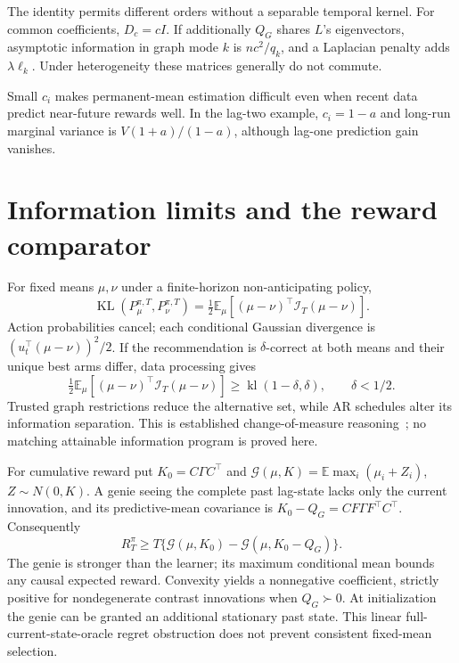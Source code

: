 \documentclass[11pt]{article}
\newcommand{\E}{\mathbb E}
\newcommand{\KL}{\operatorname{KL}}
\begin{document}
The identity permits different orders without a separable temporal kernel. For common coefficients, $D_c=cI$. If additionally $Q_G$ shares $L$'s eigenvectors, asymptotic information in graph mode $k$ is $nc^2/q_k$, and a Laplacian penalty adds $\lambda\ell_k$. Under heterogeneity these matrices generally do not commute.

Small $c_i$ makes permanent-mean estimation difficult even when recent data predict near-future rewards well. In the lag-two example, $c_i=1-a$ and long-run marginal variance is $V(1+a)/(1-a)$, although lag-one prediction gain vanishes.

\section{Information limits and the reward comparator}
For fixed means $\mu,\nu$ under a finite-horizon non-anticipating policy,
\begin{equation}
\boxed{\KL(P_\mu^{\pi,T},P_\nu^{\pi,T})
=\tfrac12\E_\mu[(\mu-\nu)^\top\mathcal I_T(\mu-\nu)].}
\label{eq:kl}
\end{equation}
Action probabilities cancel; each conditional Gaussian divergence is $(u_t^\top(\mu-\nu))^2/2$. If the recommendation is $\delta$-correct at both means and their unique best arms differ, data processing gives
\[
\tfrac12\E_\mu[(\mu-\nu)^\top\mathcal I_T(\mu-\nu)]
\ge\operatorname{kl}(1-\delta,\delta),\qquad\delta<1/2.
\]
Trusted graph restrictions reduce the alternative set, while AR schedules alter its information separation. This is established change-of-measure reasoning~\cite{combes2017,garivier2016}; no matching attainable information program is proved here.

For cumulative reward put $K_0=C\Gamma C^\top$ and $\mathcal G(\mu,K)=\E\max_i(\mu_i+Z_i)$, $Z\sim N(0,K)$. A genie seeing the complete past lag-state lacks only the current innovation, and its predictive-mean covariance is $K_0-Q_G=CF\Gamma F^\top C^\top$. Consequently
\begin{equation}
\boxed{R_T^\pi\ge
T\{\mathcal G(\mu,K_0)-\mathcal G(\mu,K_0-Q_G)\}.}
\end{equation}
The genie is stronger than the learner; its maximum conditional mean bounds any causal expected reward. Convexity yields a nonnegative coefficient, strictly positive for nondegenerate contrast innovations when $Q_G\succ0$. At initialization the genie can be granted an additional stationary past state. This linear full-current-state-oracle regret obstruction does not prevent consistent fixed-mean selection.
\end{document}
